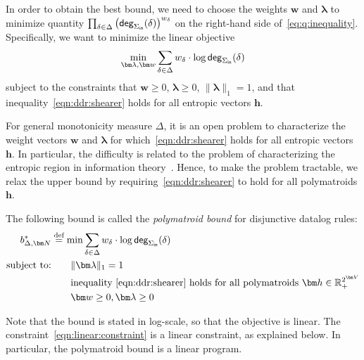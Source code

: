 \documentclass{theoretics}
\newcommand{\norm}[1]{\|#1\|}
\newcommand{\degree}{\text{\sf deg}}
\newcommand{\defeq}{\stackrel{\text{def}}{=}}
\newcommand{\Rp}{{\mathbb R}_{\tiny +}} %
\newcommand{\inn}{\text{\sf in}}
\begin{document}
In order to obtain the best bound, we need to choose the weights $\bm w$ and $\bm \lambda$
to minimize quantity $\prod_{\delta \in \Delta} \left(\degree_{\Sigma_{\inn}}(\delta)\right)^{w_\delta}$ on the right-hand side of~\eqref{eq:q:inequality}. Specifically, we want to
minimize the linear objective
\begin{align}
  \min_{\bm \lambda, \bm w} \sum_{\delta \in \Delta} w_\delta \cdot \log \degree_{\Sigma_{\inn}}(\delta)
  \label{eqn:log:objective}
\end{align}
subject to the constraints that $\bm w\geq 0$, $\bm \lambda \geq 0$, $\norm{\bm \lambda}_1=1$,
and that inequality~\eqref{eqn:ddr:shearer} holds for all entropic vectors $\bm h$.

For general monotonicity measure $\Delta$, it is an open problem to characterize
the weight vectors $\bm w$ and $\bm \lambda$ for which~\eqref{eqn:ddr:shearer} holds
for all entropic vectors $\bm h$.
In particular, the difficulty is related to the problem of
characterizing the entropic region in information theory~\cite{Yeung:2008:ITN:1457455}.
Hence, to make the problem tractable, we relax the upper bound by requiring~\eqref{eqn:ddr:shearer}
to hold for all polymatroids $\bm h$.

\begin{definition}
The following bound is called the {\em polymatroid bound} for disjunctive datalog rules:
\begin{align}
  b^*_{\Delta,\bm N} &\defeq \min \sum_{\delta \in \Delta} w_\delta \cdot \log \degree_{\Sigma_{\inn}}(\delta) \label{eqn:polymatroid:bound}\\
  \text{subject to:} &\qquad \norm{\bm \lambda}_1=1 \nonumber \\
  &\qquad \text{inequality } \eqref{eqn:ddr:shearer} \text{ holds for all polymatroids } \bm h \in \Rp^{2^{\bm V}} \label{eqn:linear:constraint}\\
  &\qquad \bm w \geq 0, \bm \lambda \geq 0 \nonumber
\end{align}
\label{defn:polymatroid:bound}
\end{definition}
Note that the bound is stated in log-scale, so that the objective is linear. The constraint~\eqref{eqn:linear:constraint}
is a linear constraint, as explained below. In particular, the polymatroid bound is a linear program.
\end{document}
